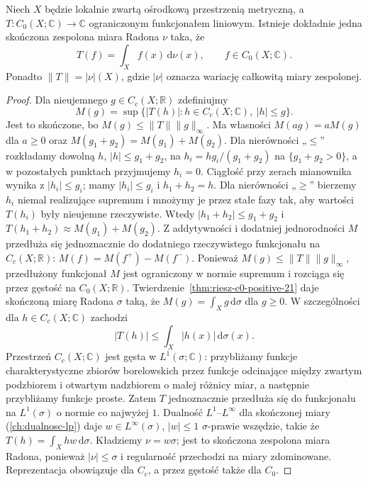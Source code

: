 \begin{twierdzenie}
\label{thm:riesz-complex-21}
Niech $X$ będzie lokalnie zwartą ośrodkową przestrzenią
metryczną, a $T:C_0(X;\mathbb C)\to\mathbb C$
ograniczonym funkcjonałem liniowym. Istnieje dokładnie
jedna skończona zespolona miara Radona $\nu$ taka, że
\[
 T(f)=\int_X f(x)\,\mathrm d\nu(x),\qquad f\in C_0(X;\mathbb C).
\]
Ponadto $\|T\|=|\nu|(X)$, gdzie $|\nu|$ oznacza
wariację całkowitą miary zespolonej.
\end{twierdzenie}
\begin{proof}
Dla nieujemnego $g\in C_c(X;\mathbb R)$ zdefiniujmy
\[
 M(g)=\sup\{|T(h)|:h\in C_c(X;\mathbb C),\ |h|\le g\}.
\]
Jest to skończone, bo $M(g)\le\|T\|\|g\|_\infty$.
Ma własności $M(ag)=aM(g)$ dla $a\ge0$ oraz
$M(g_1+g_2)=M(g_1)+M(g_2)$.
Dla nierówności „$\le$” rozkładamy dowolną $h$,
$|h|\le g_1+g_2$, na $h_i=h g_i/(g_1+g_2)$ na
$\{g_1+g_2>0\}$, a w pozostałych punktach przyjmujemy
$h_i=0$. Ciągłość przy zerach mianownika wynika
z $|h_i|\le g_i$; mamy $|h_i|\le g_i$ i
$h_1+h_2=h$. Dla nierówności „$\ge$” bierzemy
$h_i$ niemal realizujące supremum i mnożymy je przez
stałe fazy tak, aby wartości $T(h_i)$ były nieujemne
rzeczywiste. Wtedy $|h_1+h_2|\le g_1+g_2$ i
$T(h_1+h_2)\approx M(g_1)+M(g_2)$.
Z addytywności i dodatniej jednorodności $M$ przedłuża
się jednoznacznie do dodatniego rzeczywistego funkcjonału
na $C_c(X;\mathbb R)$: $M(f)=M(f^+)-M(f^-)$.
Ponieważ $M(g)\le\|T\|\|g\|_\infty$, przedłużony
funkcjonał $M$ jest ograniczony w normie supremum
i rozciąga się przez gęstość na $C_0(X;\mathbb R)$.
Twierdzenie~\ref{thm:riesz-c0-positive-21} daje
skończoną miarę Radona $\sigma$ taką, że
$M(g)=\int_Xg\,\mathrm d\sigma$ dla $g\ge0$.
W szczególności dla $h\in C_c(X;\mathbb C)$ zachodzi
\begin{equation}\label{eq:riesz-domination-21}
 |T(h)|\le \int_X|h(x)|\,\mathrm d\sigma(x).
\end{equation}
Przestrzeń $C_c(X;\mathbb C)$ jest gęsta w
$L^1(\sigma;\mathbb C)$: przybliżamy funkcje charakterystyczne
zbiorów borelowskich przez funkcje odcinające między
zwartym podzbiorem i otwartym nadzbiorem o małej
różnicy miar, a następnie przybliżamy funkcje proste.
Zatem $T$ jednoznacznie przedłuża się do funkcjonału
na $L^1(\sigma)$ o normie co najwyżej $1$.
Dualność $L^1$--$L^\infty$ dla skończonej miary
(\ref{ch:dualnosc-lp}) daje $w\in L^\infty(\sigma)$,
$|w|\le1$ $\sigma$-prawie wszędzie, takie że
$T(h)=\int_X h w\,\mathrm d\sigma$.
Kładziemy $\nu=w\sigma$; jest to skończona zespolona
miara Radona, ponieważ $|\nu|\le\sigma$ i
regularność przechodzi na miary zdominowane.
Reprezentacja obowiązuje dla $C_c$, a przez gęstość
także dla $C_0$.


\end{proof}
